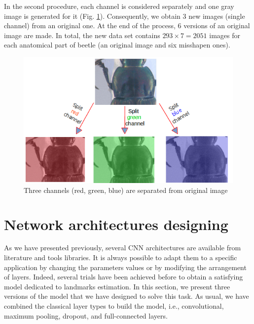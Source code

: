 \documentclass[review]{elsarticle}
\begin{document}
In the second procedure, each channel is considered separately and one gray image is generated for it (Fig. \ref{figaug2}). Consequently, we obtain 3 new images (single channel) from an original one. At the end of the process, $6$ versions of an original image are made. In total, the new data set contains $293 \times 7 = 2051$ images for each anatomical part of beetle (an original image and six misshapen ones).

\begin{figure}[h]
	\centering
	\includegraphics[scale=0.4]{images/sp_channels}
	\caption{Three channels (red, green, blue) are separated from original image}
	\label{figaug2}
\end{figure}

\section{Network architectures designing}
\label{Sneuralnetwork}
As we have presented previously, several CNN architectures are available from literature and tools libraries. It is always possible to adapt them to a specific application by changing the parameters values or by modifying the arrangement of layers. Indeed, several trials have been achieved before to obtain a satisfying model dedicated to landmarks estimation. In this section, we present three versions of the model that we have designed to solve this task. As usual, we have combined the classical layer types to build the model, i.e., convolutional, maximum pooling, dropout, and full-connected layers.
\end{document}
